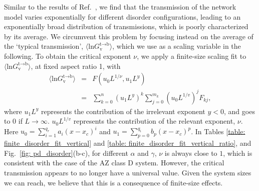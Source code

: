 \documentclass[aps,pra,reprint,superscriptaddress,showkeys,amsmath,amssymb,longbibliography]{revtex4-1}
\begin{document}
Similar to the results of Ref.~\cite{Kawabata_prl2021}, we find that the transmission of the network model varies exponentially for different disorder configurations, leading to an exponentially broad distribution of transmissions, which is poorly characterized by its average.
We circumvent this problem by focusing instead on the average of the `typical transmission', $\langle\text{ln}G_{\text{v}}^{\text{t}\rightarrow\text{b}}\rangle$, which we use as a scaling variable in the following.
To obtain the critical exponent $\nu$, we apply a finite-size scaling fit to $\langle\text{ln}G_{\text{v}}^{\text{t}\rightarrow\text{b}}\rangle$, at fixed aspect ratio 1, with
\begin{eqnarray}
\langle\text{ln}G_{\text{v}}^{\text{t}\rightarrow \text{b}}\rangle &=&F(u_0L^{1/\nu},u_1L^{y})\nonumber\\
&=&\sum_{k=0}^{n}(u_1L^{y})^k\sum_{j=0}^{m_k}(u_0L^{1/v})^jF_{kj},\label{eq:fit_equation}
\end{eqnarray}
where $u_1L^y$ represents the contribution of the irrelevant exponent $y<0$, and goes to $0$ if $L\rightarrow \infty$. $u_0L^{1/v}$ represents the contribution of the relevant exponent, $\nu$. 
Here $u_0=\sum_{i=1}^{q_r}a_i(x-x_c)^i$ and $u_1=\sum_{p=0}^{q_i}b_p(x-x_c)^p$.
In Tables \ref{table: finite_disorder_fit_vertical} and \ref{table: finite_disorder_fit_vertical_ratio}, and Fig.~\ref{fig: pd_disorder}(b-c), for different $\alpha$ and $\gamma$, $\nu$ is always close to $1$, which is consistent with the case of the AZ class D system. 
However, the critical transmission appears to no longer have a universal value.
Given the system sizes we can reach, we believe that this is a consequence of finite-size effects.
\end{document}
